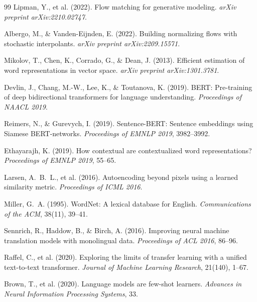 \documentclass[12pt, a4paper]{article}
\theoremstyle{plain}
\theoremstyle{definition}
\theoremstyle{remark}
\begin{document}
\begin{thebibliography}{99}
Lipman, Y., et al. (2022).
\newblock Flow matching for generative modeling.
\newblock \emph{arXiv preprint arXiv:2210.02747}.

Albergo, M., \& Vanden-Eijnden, E. (2022).
\newblock Building normalizing flows with stochastic interpolants.
\newblock \emph{arXiv preprint arXiv:2209.15571}.


Mikolov, T., Chen, K., Corrado, G., \& Dean, J. (2013).
\newblock Efficient estimation of word representations in vector space.
\newblock \emph{arXiv preprint arXiv:1301.3781}.

Devlin, J., Chang, M.-W., Lee, K., \& Toutanova, K. (2019).
\newblock BERT: Pre-training of deep bidirectional transformers for language
  understanding.
\newblock \emph{Proceedings of NAACL 2019}.

Reimers, N., \& Gurevych, I. (2019).
\newblock Sentence-BERT: Sentence embeddings using Siamese BERT-networks.
\newblock \emph{Proceedings of EMNLP 2019}, 3982--3992.

Ethayarajh, K. (2019).
\newblock How contextual are contextualized word representations?
\newblock \emph{Proceedings of EMNLP 2019}, 55--65.

Larsen, A.~B.~L., et al. (2016).
\newblock Autoencoding beyond pixels using a learned similarity metric.
\newblock \emph{Proceedings of ICML 2016}.


Miller, G.~A. (1995).
\newblock WordNet: A lexical database for English.
\newblock \emph{Communications of the ACM}, 38(11), 39--41.

Sennrich, R., Haddow, B., \& Birch, A. (2016).
\newblock Improving neural machine translation models with monolingual data.
\newblock \emph{Proceedings of ACL 2016}, 86--96.

Raffel, C., et al. (2020).
\newblock Exploring the limits of transfer learning with a unified
  text-to-text transformer.
\newblock \emph{Journal of Machine Learning Research}, 21(140), 1--67.

Brown, T., et al. (2020).
\newblock Language models are few-shot learners.
\newblock \emph{Advances in Neural Information Processing Systems}, 33.


\end{thebibliography}
\end{document}

